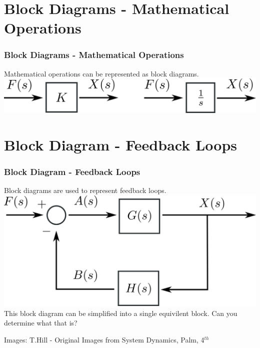 \documentclass{beamer}                  %
\newcommand{\sectiontitleIV}{Block Diagrams - Mathematical Operations}
\newcommand{\sectiontitleV}{Block Diagram - Feedback Loops}
\begin{document}
	\begin{frame} \small
	

	\end{frame}	



\section{\sectiontitleIV}

	\begin{frame}[label=sectionIV] \small
		\frametitle{\sectiontitleIV}
		

		Mathematical operations can be represented as block diagrams. \vspace{2mm}\\

		\includegraphics[scale=.04]{two_types_blocks.png}
	\end{frame}	

\section{\sectiontitleV}

	\begin{frame}[label=sectionV] \small
		\frametitle{\sectiontitleV}

		Block diagrams are used to represent feedback loops. \vspace{5mm} \\
		
		\includegraphics[scale=0.04]{generalized_feedback_loop.png} \vspace{5mm} \\

		 This block diagram can be simplified into a single equivilent block. Can you determine what that is?	

		\btVFill
		\tiny{Images: T.Hill - Original Images from System Dynamics, Palm, 4$^{th}$}

	\end{frame}	
\end{document}
